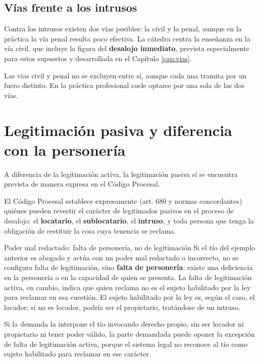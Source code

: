 \documentclass[12pt,oneside]{book}
\begin{document}
\subsection{Vías frente a los intrusos}

Contra los intrusos existen dos vías posibles: la civil y la penal, aunque en la práctica la vía penal resulta poco efectiva. La cátedra centra la enseñanza en la vía civil, que incluye la figura del \textbf{desalojo inmediato}, prevista especialmente para estos supuestos y desarrollada en el Capítulo \ref{cap:vias}.

\begin{note}
Las vías civil y penal no se excluyen entre sí, aunque cada una tramita por un fuero distinto. En la práctica profesional suele optarse por una sola de las dos vías.
\end{note}

\section{Legitimación pasiva y diferencia con la personería}

A diferencia de la legitimación activa, la legitimación pasiva sí se encuentra prevista de manera expresa en el Código Procesal.

\begin{normacitada}
El Código Procesal establece expresamente (art. 680 y normas concordantes) quiénes pueden revestir el carácter de legitimados pasivos en el proceso de desalojo: el \textbf{locatario}, el \textbf{sublocatario}, el \textbf{intruso}, y toda persona que tenga la obligación de restituir la cosa cuya tenencia se reclama.
\end{normacitada}

\begin{example}{Poder mal redactado: falta de personería, no de legitimación}
Si el tío del ejemplo anterior es abogado y actúa con un poder mal redactado o incorrecto, no se configura falta de legitimación, sino \textbf{falta de personería}: existe una deficiencia en la personería o en la capacidad de quien se presenta. La falta de legitimación activa, en cambio, indica que quien reclama no es el sujeto habilitado por la ley para reclamar en esa cuestión. El sujeto habilitado por la ley es, según el caso, el locador; si no es locador, podría ser el propietario, tratándose de un intruso.

Si la demanda la interpone el tío invocando derecho propio, sin ser locador ni propietario ni tener poder válido, la parte demandada puede oponer la excepción de falta de legitimación activa, porque el sistema legal no reconoce al tío como sujeto habilitado para reclamar en ese carácter.
\end{example}
\end{document}

